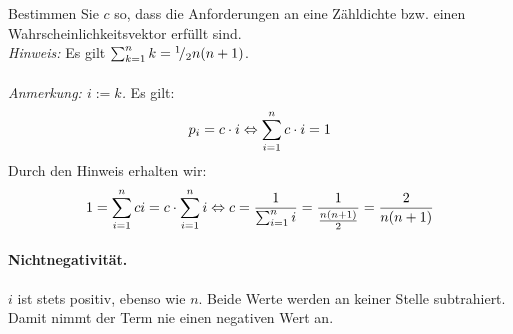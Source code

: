 \documentclass[twoside]{article}
\begin{document}
	Bestimmen Sie $c$ so, dass die Anforderungen an eine Zähldichte bzw. einen Wahrscheinlichkeitsvektor erfüllt sind.\\
	

	\textit{Hinweis:} Es gilt $\sum_{k=1}^{n}k={}^{1}\!/_{2}n(n+1)$.
	\\\vspace{.4cm}\\
	\textit{Anmerkung: $i := k$.}
	Es gilt: 
	\[
		p_i = c \cdot i \Leftrightarrow \sum_{i= 1}^{n} c \cdot i = 1
	\]
	Durch den Hinweis erhalten wir:
	\[
		1 = \sum_{i= 1}^{n}ci = c\cdot \sum_{i= 1}^{n} i \Leftrightarrow c = \frac{1}{\sum_{i= 1}^{n} i} = \frac{1}{\frac{n(n+1)}{2}} = \frac{2}{n(n+1)}
	\]
	\paragraph{Nichtnegativität.}
	$i$ ist stets positiv, ebenso wie $n$.
	Beide Werte werden an keiner Stelle subtrahiert.
	Damit nimmt der Term nie einen negativen Wert an.
\end{document}
